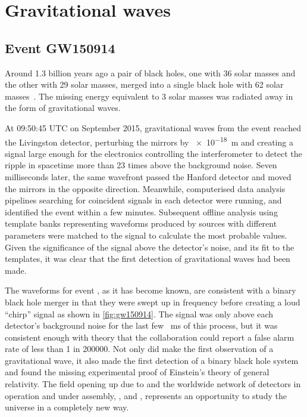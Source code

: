 \chapter{\label{c:gw-detection}Gravitational waves}

\section{Event GW150914}
Around \num{1.3} billion years ago a pair of black holes, one with \num{36} solar masses and the other with \num{29} solar masses, merged into a single black hole with \num{62} solar masses~\cite{Abbott2016}. The missing energy equivalent to \num{3} solar masses was radiated away in the form of gravitational waves.

At 09:50:45 \gls{UTC} on  September 2015, gravitational waves from the event reached the \LIGO{} Livingston detector, perturbing the mirrors by \SI{e-18}{\meter} and creating a signal large enough for the electronics controlling the interferometer to detect the ripple in spacetime more than \num{23} times above the background noise. Seven milliseconds later, the same wavefront passed the \LIGO{} Hanford detector and moved the mirrors in the opposite direction. Meanwhile, computerised data analysis pipelines searching for coincident signals in each detector were running, and identified the event within a few minutes. Subsequent offline analysis using template banks representing waveforms produced by sources with different parameters were matched to the signal to calculate the most probable values. Given the significance of the signal above the detector's noise, and its fit to the templates, it was clear that the first detection of gravitational waves had been made.

The waveforms for event \emph{\GWFIRSTEVENT{}}, as it has become known, are consistent with a binary black hole merger in that they were swept up in frequency before creating a loud ``chirp'' signal as shown in \cref{fig:gw150914}. The signal was only above each detector's background noise for the last few \SI{}{\milli\second} of this process, but it was consistent enough with theory that the collaboration could report a false alarm rate of less than \num{1} in \num{200000}. Not only did \LIGO{} make the first observation of a gravitational wave, it also made the first detection of a binary black hole system and found the missing experimental proof of Einstein's theory of general relativity. The field opening up due to \LIGO{} and the worldwide network of detectors in operation and under assembly, \GEO{}, \VIRGO{} and \KAGRA{}, represents an opportunity to study the universe in a completely new way.

